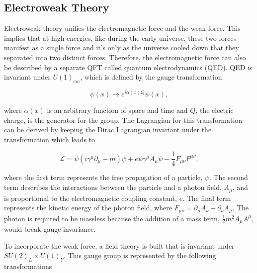 \subsection{Electroweak Theory}
\label{sec:ElelctroW}

Electroweak theory unifies the electromagnetic force and the weak force. This implies that at high energies, like during the early universe, these two forces manifest as a single force and it's only as the universe cooled down that they separated into two distinct forces. Therefore, the electromagnetic force can also be described by a separate QFT called quantum electrodynamics (QED). QED is invariant under $U(1)_{em}$, which is defined by the gauge transformation

\begin{equation}
\psi(x)\rightarrow e^{i\alpha(x)Q}\psi(x),
\end{equation}

\noindent
where $\alpha(x)$ is an arbitrary function of space and time and $Q$, the electric charge, is the generator for the group. The Lagrangian for this transformation can be derived by keeping the Dirac Lagrangian invariant under the transformation which leads to

\begin{equation}
\mathcal{L}= \bar{\psi}(i\gamma^{\mu}\partial_{\mu} - m)\psi + e\bar{\psi}\gamma^{\mu}A_{\mu}\psi - \frac{1}{4}F_{\mu\nu}F^{\mu\nu},
\end{equation}

\noindent
where the first term represents the free propagation of a particle, $\psi$. The second term describes the interactions between the particle and a photon field, $A_{\mu}$, and is proportional to the electromagnetic coupling constant, $e$. The final term represents the kinetic energy of the photon field, where $F_{\mu\nu}=\partial_{\mu}A_{\nu}-\partial_{\nu}A_{\mu}$. The photon is required to be massless because the addition of a mass term, $\frac{1}{2}m^{2}A_{\mu}A^{\mu}$, would break gauge invariance. 

To incorporate the weak force, a field theory is built that is invariant under $SU(2)_{L}\times U(1)_{Y}$. This gauge group is represented by the following transformations


